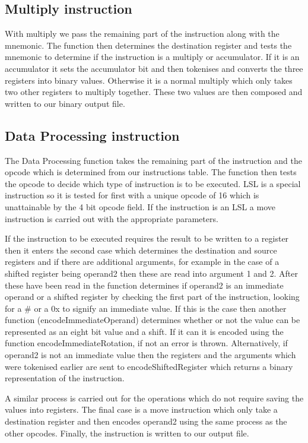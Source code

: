 \documentclass[11pt]{article}
\begin{document}
\subsection{Multiply instruction}
With multiply we pass the remaining part of the instruction along with the mnemonic. The function then determines the destination register and tests the mnemonic to determine if the instruction is a multiply or accumulator. If it is an accumulator it sets the accumulator bit and then tokenises and converts the three registers into binary values. Otherwise it is a normal multiply which only takes two other registers to multiply together. These two values are then composed and written to our binary output file. \par
\subsection{Data Processing instruction}
The Data Processing function takes the remaining part of the instruction and the opcode which is determined from our instructions table. The function then tests the opcode to decide which type of instruction is to be executed. LSL is a special instruction so it is tested for first with a unique opcode of 16 which is unattainable by the 4 bit opcode field. If the instruction is an LSL a move instruction is carried out with the appropriate parameters. \par
If the instruction to be executed requires the result to be written to a register then it enters the second case which determines the destination and source registers and if there are additional arguments, for example in the case of a shifted register being operand2 then these are read into argument 1 and 2. After these have been read in the function determines if operand2 is an immediate operand or a shifted register by checking the first part of the instruction, looking for a \# or a 0x to signify an immediate value. If this is the case then another function (encodeImmediateOperand) determines whether or not the value can be represented as an eight bit value and a shift. If it can it is encoded using the function encodeImmediateRotation, if not an error is thrown. Alternatively, if operand2 is not an immediate value then the registers and the arguments which were tokenised earlier are sent to encodeShiftedRegister which returns a binary representation of the instruction. \par
A similar process is carried out for the operations which do not require saving the values into registers. The final case is a move instruction which only take a destination register and then encodes operand2 using the same process as the other opcodes. Finally, the instruction is written to our output file.
\end{document}
